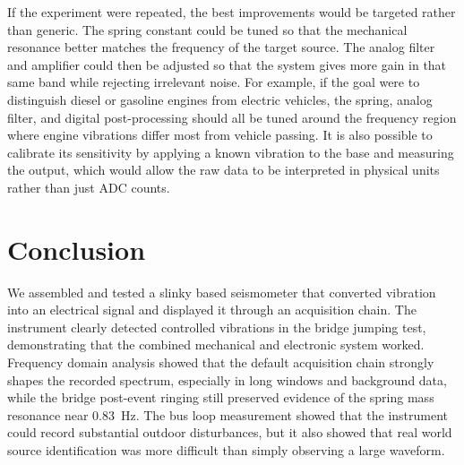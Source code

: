 \documentclass[11pt]{article}
\begin{document}
If the experiment were repeated, the best improvements would be targeted rather than generic. The spring constant could be tuned so that the mechanical resonance better matches the frequency of the target source. The analog filter and amplifier could then be adjusted so that the system gives more gain in that same band while rejecting irrelevant noise. For example, if the goal were to distinguish diesel or gasoline engines from electric vehicles, the spring, analog filter, and digital post-processing should all be tuned around the frequency region where engine vibrations differ most from vehicle passing. It is also possible to calibrate its sensitivity by applying a known vibration to the base and measuring the output, which would allow the raw data to be interpreted in physical units rather than just ADC counts.

\section{Conclusion}
We assembled and tested a slinky based seismometer that converted vibration into an electrical signal and displayed it through an acquisition chain. The instrument clearly detected controlled vibrations in the bridge jumping test, demonstrating that the combined mechanical and electronic system worked. Frequency domain analysis showed that the default acquisition chain strongly shapes the recorded spectrum, especially in long windows and background data, while the bridge post-event ringing still preserved evidence of the spring mass resonance near \SI{0.83}{\hertz}. The bus loop measurement showed that the instrument could record substantial outdoor disturbances, but it also showed that real world source identification was more difficult than simply observing a large waveform. 
\end{document}
